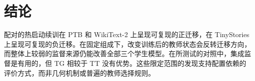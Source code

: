 \section{结论}\label{sec:conclusion}

配对的热启动续训在 PTB 和 WikiText-2 上呈现可复现的正迁移，在 TinyStories 上呈现可复现的负迁移。在固定组成下，改变训练后的教师状态会反转迁移方向，而整体上较弱的监督来源仍能改善全部三个学生模型。在所测试的对照中，集成监督是有用的，但 TG 相较于 TT 没有优势。这些限定范围的发现支持配置依赖的评价方式，而非几何机制或普遍的教师选择规则。
\label{end:main-text}
